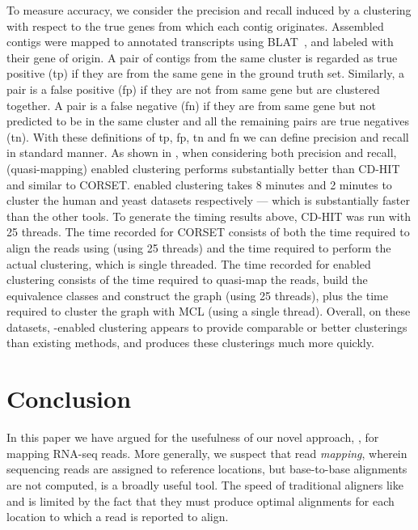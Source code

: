 To measure accuracy, we consider the precision and recall induced by a clustering with respect to the true genes from which each contig originates.  Assembled contigs were mapped to annotated transcripts using BLAT~\citep{kent2002blat}, and labeled with their gene of origin. A pair of contigs from the same cluster is regarded as true positive (tp) if they are from the same gene in the ground truth set. Similarly, a pair is a false positive (fp) if they are not from same gene but are clustered together.  A pair is a false negative (fn) if they are from same gene but not predicted to be in the same cluster and all the remaining pairs are true negatives (tn). With these definitions of tp, fp, tn and fn we can define precision and recall in standard manner. As shown in , when considering both precision and recall, \rapmap (quasi-mapping) enabled clustering performs substantially better than CD-HIT and similar to CORSET. \rapmap enabled clustering takes 8 minutes and 2 minutes to cluster the human and yeast datasets respectively --- which is substantially faster than the other tools. To generate the timing results above, CD-HIT was run with 25 threads. The time recorded for CORSET consists of both the time required to align the reads using \bt (using 25 threads) and the time required to perform the actual clustering, which is single threaded.  The time recorded for \rapmap enabled clustering consists of the time required to quasi-map the reads, build the equivalence classes and construct the graph (using 25 threads), plus the time required to cluster the graph with MCL (using a single thread). Overall, on these datasets, \rapmap-enabled clustering appears to provide comparable or better clusterings than existing methods, and produces these clusterings much more quickly.


\section{Conclusion}
In this paper we have argued for the usefulness of our novel approach, \qm, for mapping RNA-seq reads.  More generally, we suspect that read \textit{mapping}, wherein sequencing reads are assigned to reference locations, but base-to-base alignments are not computed, is a broadly useful tool.  The speed of traditional aligners like \bt and \STAR is limited by the fact that they must produce optimal alignments for each location to which a read is reported to align.

